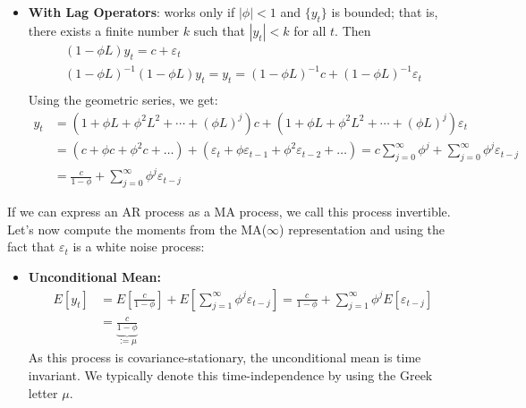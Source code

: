 \begin{enumerate}
\begin{itemize}
\item
\textbf{With Lag Operators}:
works only if \(|\phi| < 1\) and \( \{y_t\} \) is bounded;
that is, there exists a finite number \(k\) such that \(|y_t| < k\) for all \(t\).
Then
\begin{align*}
(1-\phi L) y_t = c + \varepsilon_t
\\
{(1-\phi L)}^{-1}{(1-\phi L)} y_t =	y_t = {(1-\phi L)}^{-1} c + {(1-\phi L)}^{-1}\varepsilon_t
\\
\end{align*}
Using the geometric series, we get:
\begin{align*}
y_t &= (1+\phi L + \phi^2 L^2+\cdots+{(\phi L)}^j) c
  + (1+\phi L + \phi^2 L^2+\cdots+{(\phi L)}^j)\varepsilon_t
\\
&= \left(c + \phi c + \phi^2 c + \ldots \right) + \left(\varepsilon_t + \phi \varepsilon_{t-1} + \phi^2 \varepsilon_{t-2}+\ldots\right)
= c \sum_{j=0}^\infty \phi^j + \sum_{j=0}^\infty \phi^j \varepsilon_{t-j}
\\
&= \frac{c}{1-\phi} + \sum_{j=0}^\infty \phi^j \varepsilon_{t-j}
\end{align*}
\end{itemize}
If we can express an AR process as a MA process, we call this process invertible.
Let's now compute the moments from the MA{(\(\infty \))} representation
  and using the fact that \(\varepsilon_t\) is a white noise process:
\begin{itemize}
\item
\textbf{Unconditional Mean:}
\begin{align*}
E[y_t] &= E\left[\frac{c}{1-\phi}\right] + E\left[\sum_{j=1}^{\infty} \phi^j \varepsilon_{t-j}\right]
= \frac{c}{1-\phi} + \sum_{j=1}^{\infty} \phi^j E[\varepsilon_{t-j}]
\\
&= \underbrace{\frac{c}{1-\phi}}_{:=\mu}
\end{align*}
As this process is covariance-stationary, the unconditional mean is time invariant.
We typically denote this time-independence by using the Greek letter \(\mu \).


\end{itemize}
\end{enumerate}
